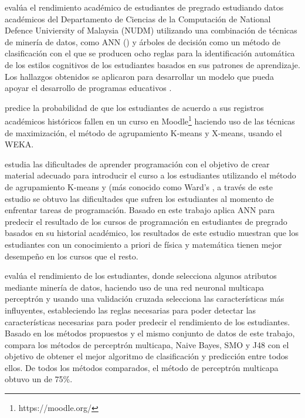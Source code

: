 \textcite{chen2008integrated} evalúa el rendimiento académico de estudiantes de pregrado estudiando datos académicos del Departamento de Ciencias de la Computación de National Defence Univiersity of Malaysia (NUDM) utilizando una combinación de técnicas de minería de datos, como ANN () y árboles de decisión como un método de clasificación con el que se producen ocho reglas para la identificación automática de los estilos cognitivos de los estudiantes basados en sus patrones de aprendizaje. Los hallazgos obtenidos se aplicaron para desarrollar un modelo que pueda apoyar el desarrollo de programas educativos .

\textcite{moreno2009data} predice la probabilidad de que los estudiantes de acuerdo a sus registros académicos históricos fallen en un curso  en Moodle\footnote{https://moodle.org/} haciendo uso de las técnicas de maximización, el método de agrupamiento K-means y X-means, usando el  WEKA.


\textcite{lahtinen2005study} estudia las dificultades de aprender programación con el objetivo de crear material adecuado para introducir el curso a los estudiantes utilizando el método de agrupamiento K-means y  (más conocido como Ward's , a través de este estudio se obtuvo las dificultades que sufren los estudiantes al momento de enfrentar tareas de programación. Basado en este trabajo \textcite{akinola2012data} aplica ANN para predecir el resultado de los cursos de programación en estudiantes de pregrado basados en su historial académico, los resultados de este estudio muestran que los estudiantes con un conocimiento a priori de física y matemática tienen mejor desempeño en los cursos que el resto.

\textcite{borkar2014attributes} evalúa el rendimiento de los estudiantes, donde selecciona algunos atributos mediante minería de datos, haciendo uso de una red neuronal multicapa perceptrón y usando una validación cruzada selecciona las características más influyentes, estableciendo las reglas necesarias para poder detectar las características necesarias para poder predecir el rendimiento de los estudiantes. Basado en los métodos propuestos y el mismo conjunto de datos de este trabajo, \textcite{jayakameswaraiah2014study} compara los métodos de perceptrón multicapa, Naive Bayes, SMO y J48 con el objetivo de obtener el mejor algoritmo de clasificación y predicción entre todos ellos. De todos los métodos comparados, el método de perceptrón multicapa obtuvo un  de 75\%.


